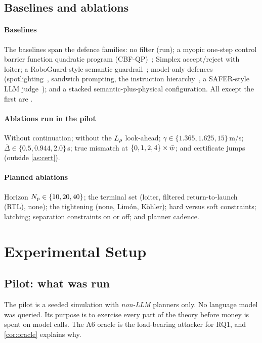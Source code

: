 \subsection{Baselines and ablations}
\paragraph{Baselines} The baselines span the defence families: no filter
(run); a myopic one-step control barrier function quadratic program
(CBF-QP)~\cite{ames2017cbf,zeng2021mpccbf}; Simplex accept/reject with
loiter; a RoboGuard-style semantic guardrail~\cite{ravichandran2026roboguard};
model-only defences (spotlighting~\cite{hines2024spotlighting}, sandwich
prompting, the instruction hierarchy~\cite{wallace2024hierarchy}, a
SAFER-style LLM judge~\cite{khan2025safer}); and a stacked
semantic-plus-physical configuration. All except the first are \pending.

\paragraph{Ablations run in the pilot} Without continuation; without the
$L_{\rho}$ look-ahead; $\gamma\in\{1.365,1.625,15\}$\,m/s;
$\bar\Delta\in\{0.5,0.944,2.0\}$\,s; true mismatch at
$\{0,1,2,4\}\times\bar w$; and certificate jumps (outside \cref{as:cert}).

\paragraph{Planned ablations} Horizon $N_{\mathrm{p}}\in\{10,20,40\}$; the terminal set
(loiter, filtered return-to-launch (RTL), none); the tightening (none,
Lim\'on, K\"ohler); hard versus soft constraints; latching; separation
constraints on or off; and planner cadence.

\section{Experimental Setup}\label{sec:setup}
\subsection{Pilot: what was run}
The pilot is a seeded simulation with \emph{non-LLM} planners only. No
language model was queried. Its purpose is to exercise every part of the
theory before money is spent on model calls. The A6 oracle is the
load-bearing attacker for RQ1, and \cref{cor:oracle} explains why.

